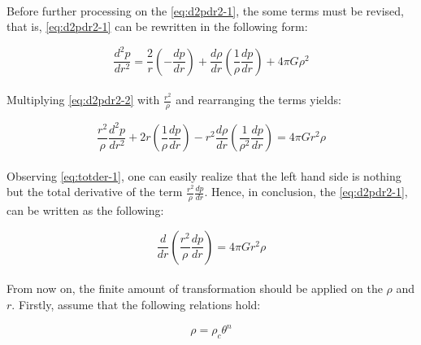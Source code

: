 \documentclass[letterpaper,12pt]{article}
\begin{document}
\paragraph{} Before further processing on the \eqref{eq:d2pdr2-1}, the some terms must be revised, that is, \eqref{eq:d2pdr2-1} can be rewritten in the following form:

\begin{equation}
    \label{eq:d2pdr2-2}
    \frac{d^2p}{dr^2} = \frac{2}{r}\left(-\frac{dp}{dr}\right) + \frac{d\rho}{dr}\left(\frac{1}{\rho}\frac{dp}{dr}\right) + 4\pi G \rho^2
\end{equation}

\paragraph{}Multiplying \eqref{eq:d2pdr2-2} with $\frac{r^2}{\rho}$ and rearranging the terms yields:

\begin{equation}
    \label{eq:totder-1}
    \frac{r^2}{\rho}\frac{d^2p}{dr^2} + 2r\left(\frac{1}{\rho}\frac{dp}{dr}\right) - r^2\frac{d\rho}{dr}\left(\frac{1}{\rho^2}\frac{dp}{dr}\right) = 4\pi G r^2 \rho
\end{equation}

\paragraph{}Observing \eqref{eq:totder-1}, one can easily realize that the left hand side is nothing but the total derivative of the term $\frac{r^2}{\rho}\frac{dp}{dr}$. Hence, in conclusion, the \eqref{eq:d2pdr2-1}, can be written as the following:

\begin{equation}
    \label{eq:totder-2}
    \frac{d}{dr}\left(\frac{r^2}{\rho}\frac{dp}{dr}\right) = 4\pi G r^2 \rho
\end{equation}

\paragraph{} From now on, the finite amount of transformation should be applied on the $\rho$ and $r$. Firstly, assume that the following relations hold:

\begin{equation*}
    \rho = \rho_c \theta^n
\end{equation*}
\end{document}
